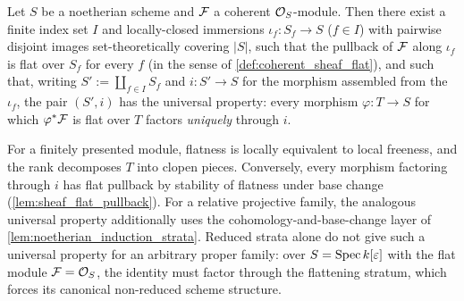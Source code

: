 \begin{theorem}[Universal property of the flat-locus stratification (case
  \(n = 0\))]
  \label{thm:flattening_stratification_universal}
  \leanok
  Let \(S\) be a noetherian scheme and \(\mathcal{F}\) a coherent \(\mathcal{O}_S\)-module.
  Then there exist a finite index set \(I\) and locally-closed immersions
  \(\iota_f : S_f \to S\) (\(f \in I\)) with pairwise disjoint images
  set-theoretically covering \(|S|\), such that the pullback of \(\mathcal{F}\)
  along \(\iota_f\) is flat over \(S_f\) for every \(f\) (in the sense of
  \cref{def:coherent_sheaf_flat}), and such that, writing
  \(S' := \coprod_{f \in I} S_f\) and \(i : S' \to S\) for the morphism
  assembled from the \(\iota_f\), the pair \((S', i)\) has the universal
  property: every morphism \(\varphi : T \to S\) for which
  \(\varphi^* \mathcal{F}\) is flat over \(T\) factors \emph{uniquely} through
  \(i\).

  For a finitely presented module, flatness is locally equivalent to local
  freeness, and the rank decomposes \(T\) into clopen pieces.  Conversely,
  every morphism factoring through \(i\) has flat pullback by stability of
  flatness under base change (\cref{lem:sheaf_flat_pullback}).  For a relative
  projective family, the analogous universal property additionally uses the
  cohomology-and-base-change layer of
  \cref{lem:noetherian_induction_strata}.  Reduced strata alone do not give
  such a universal property for an arbitrary proper family: over
  \(S = \operatorname{Spec} k[\varepsilon]\) with the flat module \(\mathcal{F} = \mathcal{O}_S\), the
  identity must factor through the flattening stratum, which forces its
  canonical non-reduced scheme structure.
\end{theorem}

